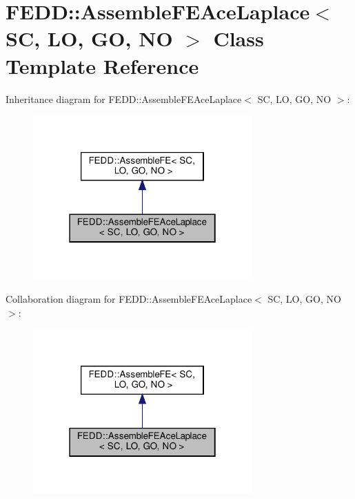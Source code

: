 \hypertarget{classFEDD_1_1AssembleFEAceLaplace}{}\section{F\+E\+DD\+:\+:Assemble\+F\+E\+Ace\+Laplace$<$ SC, LO, GO, NO $>$ Class Template Reference}
\label{classFEDD_1_1AssembleFEAceLaplace}


Inheritance diagram for F\+E\+DD\+:\+:Assemble\+F\+E\+Ace\+Laplace$<$ SC, LO, GO, NO $>$\+:\nopagebreak
\begin{figure}[H]
\begin{center}
\leavevmode
\includegraphics[width=238pt]{classFEDD_1_1AssembleFEAceLaplace__inherit__graph}
\end{center}
\end{figure}


Collaboration diagram for F\+E\+DD\+:\+:Assemble\+F\+E\+Ace\+Laplace$<$ SC, LO, GO, NO $>$\+:\nopagebreak
\begin{figure}[H]
\begin{center}
\leavevmode
\includegraphics[width=238pt]{classFEDD_1_1AssembleFEAceLaplace__coll__graph}
\end{center}
\end{figure}
